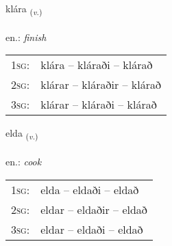 \documentclass[frontgrid, backgrid]{flacards}\usepackage[]{graphicx}\usepackage[]{xcolor}
\begin{document}
\renewcommand{\flhead}{\vskip5pt \fboxsep=0pt {\small\bfseries\footnotesize Sagnorð | Verb}}
\renewcommand{\fcfoot}{\vskip5pt \fboxsep=0pt \hspace{2pt}{\small\bfseries\footnotesize 2K}}

\renewcommand{\blhead}{\vskip5pt {\small\bfseries\footnotesize Sagnorð | Verb }}
\renewcommand{\bcfoot}{\vskip5pt \hspace{2pt}{\small\bfseries\footnotesize 2K}}


{klára \small{\textsubscript{(\textit{v.})}} \\[1ex] %
\textphonetic{[kʰlauːra]} \\
en.: \emph{finish} \\  [2ex]
\renewcommand*{\arraystretch}{0.8}
\begin{tabular}{p{1cm}l}
\textsc{1sg}: & klára -- kláraði -- klárað \\ 
\textsc{2sg}: & klárar -- kláraðir -- klárað \\ 
\textsc{3sg}: & klárar -- kláraði -- klárað \\ 
\end{tabular}
}

\renewcommand{\flhead}{\vskip5pt \fboxsep=0pt {\small\bfseries\footnotesize Sagnorð | Verb}}
\renewcommand{\fcfoot}{\vskip5pt \fboxsep=0pt \hspace{2pt}{\small\bfseries\footnotesize 2K}}

\renewcommand{\blhead}{\vskip5pt {\small\bfseries\footnotesize Sagnorð | Verb }}
\renewcommand{\bcfoot}{\vskip5pt \hspace{2pt}{\small\bfseries\footnotesize 2K}}


{elda \small{\textsubscript{(\textit{v.})}} \\[1ex] %
\textphonetic{[ɛlta]} \\
en.: \emph{cook} \\  [2ex]
\renewcommand*{\arraystretch}{0.8}
\begin{tabular}{p{1cm}l}
\textsc{1sg}: & elda -- eldaði -- eldað \\ 
\textsc{2sg}: & eldar -- eldaðir -- eldað \\ 
\textsc{3sg}: & eldar -- eldaði -- eldað \\ 
\end{tabular}
}
\end{document}
